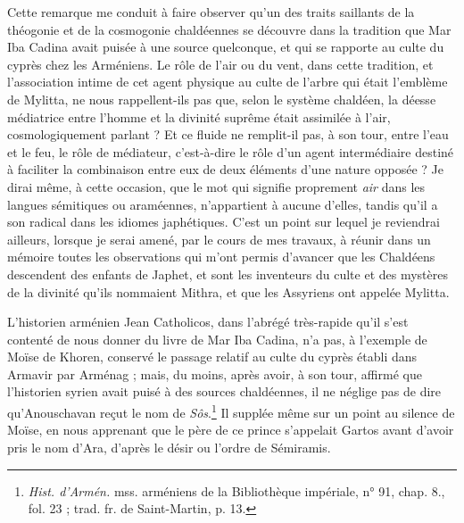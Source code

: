 \documentclass{article}
\begin{document}
Cette remarque me conduit à faire observer qu'un des traits saillants de la théogonie et de la cosmogonie chaldéennes se découvre dans la tradition que Mar Iba Cadina avait puisée à une source quelconque, et qui se rapporte au culte du cyprès chez les Arméniens. Le rôle de l'air ou du vent, dans cette tradition, et l'association intime de cet agent physique au culte de l'arbre qui était l'emblème de Mylitta, ne nous rappellent-ils pas que, selon le système chaldéen, la déesse médiatrice entre l'homme et la divinité suprême était assimilée à l'air, cosmologiquement parlant ? Et ce fluide ne remplit-il pas, à son tour, entre l'eau et le feu, le rôle de médiateur, c'est-à-dire le rôle d'un agent intermédiaire destiné à faciliter la combinaison entre eux de deux éléments d'une nature opposée ? Je dirai même, à cette occasion, que le mot qui signifie proprement \emph{air} dans les langues sémitiques ou araméennes, n'appartient à aucune d'elles, tandis qu'il a son radical dans les idiomes japhétiques. C'est un point sur lequel je reviendrai ailleurs, lorsque je serai amené, par le cours de mes travaux, à réunir dans un mémoire toutes les observations qui m'ont permis d'avancer que les Chaldéens descendent des enfants de Japhet, et sont les inventeurs du culte et des mystères de la divinité qu'ils nommaient Mithra, et que les Assyriens ont appelée Mylitta.

L'historien arménien Jean Catholicos, dans l'abrégé très-rapide qu'il s'est contenté de nous donner du livre de Mar Iba Cadina, n'a pas, à l'exemple de Moïse de Khoren, conservé le passage relatif au culte du cyprès établi dans Armavir par Arménag ; mais, du moins, après avoir, à son tour, affirmé que l'historien syrien avait puisé à des sources chaldéennes, il ne néglige pas de dire qu'Anouschavan reçut le nom de \emph{Sôs}.\footnote{\emph{Hist. d'Armén.} mss. arméniens de la Bibliothèque impériale, n° 91, chap. 8., fol. 23 ; trad. fr. de Saint-Martin, p. 13.} Il supplée même sur un point au silence de Moïse, en nous apprenant que le père de ce prince s'appelait Gartos avant d'avoir pris le nom d'Ara, d'après le désir ou l'ordre de Sémiramis.
\end{document}
